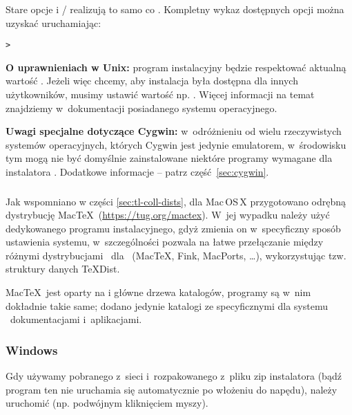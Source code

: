 \documentclass{article}
\begin{document}
Stare opcje  i /  
  realizują to samo co .
Kompletny wykaz dostępnych opcji można uzyskać uruchamiając:
\begin{alltt}
> 
\end{alltt}


\textbf{O  uprawnieniach w Unix:} program instalacyjny
będzie respektować aktualną wartość .
Jeżeli więc chcemy, aby instalacja była dostępna dla innych użytkowników,
musimy ustawić wartość np. . Więcej informacji na temat
 znajdziemy w~dokumentacji posiadanego systemu operacyjnego.

\textbf{Uwagi specjalne dotyczące Cygwin:} w~odróżnieniu od wielu
rzeczywistych systemów operacyjnych, których Cygwin jest jedynie emulatorem,
w~środowisku tym mogą nie być domyślnie zainstalowane niektóre programy
wymagane dla instalatora \TL. Dodatkowe informacje -- patrz
część~\ref{sec:cygwin}.


\subsubsection{\MacOSX}
\label{sec:macosx}

Jak wspomniano w części \ref{sec:tl-coll-dists}, dla Mac\,OS\,X{}
przygotowano odrębną dystrybucję Mac\TeX\ (\url{https://tug.org/mactex}).
W~jej wypadku należy użyć dedykowanego programu instalacyjnego, gdyż
zmienia on w~specyficzny sposób ustawienia systemu, w~szczególności pozwala
na łatwe przełączanie między różnymi dystrybucjami \TL\ dla  %
\MacOSX\ (Mac\TeX, Fink, MacPorts, \ldots), wykorzystując tzw.
struktury danych \TeX{}Dist.

Mac\TeX\ jest oparty na \TL{} i główne drzewa katalogów, programy są
w~nim dokładnie takie same; dodano jedynie katalogi ze specyficznymi dla
systemu \MacOSX\ dokumentacjami i~aplikacjami.


 
\subsubsection{Windows}\label{sec:wininst}

Gdy używamy pobranego z~sieci i~rozpakowanego z~pliku zip instalatora
(bądź program ten nie uruchamia się  automatycznie po włożeniu \DVD{}
do napędu), należy uruchomić  (np.
podwójnym kliknięciem myszy). %
\end{document}
